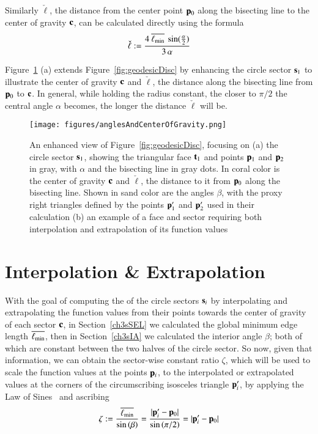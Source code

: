 Similarly $\check{\ell}$, the distance from the center point $\mathbf{p}_0$ along the bisecting line to the center of gravity $\mathbf{c}$, can be calculated directly using the formula
%
\begin{equation}
	\check{\ell} := \frac{4\:\overline{\ell_\text{min}}\:\sin(\frac{\alpha}{2})}{3\,\alpha}
	\label{eq:distToCoG}
\end{equation}%

Figure~\ref{fig:anglesAndCenterOfGravity} (a) extends Figure~\ref{fig:geodesicDisc} by enhancing the circle sector $\mathbf{s}_1$ to illustrate the center of gravity $\mathbf{c}$ and $\check{\ell}$, the distance along the bisecting line from $\mathbf{p}_0$ to $\mathbf{c}$. In general, while holding the radius constant, the closer to $\pi/2$ the central angle $\alpha$ becomes, the longer the distance $\check{\ell}$ will be.

\begin{figure}[ht]
\ffigbox
	{\texttt{[image: figures/anglesAndCenterOfGravity.png]}}
	{\caption[Angles and Center of Gravity]{An enhanced view of Figure~\ref{fig:geodesicDisc}, focusing on (a) the circle sector $\mathbf{s}_1$, showing the triangular face $\mathbf{t}_1$ and points $\mathbf{p}_1$ and $\mathbf{p}_2$ in gray, with $\alpha$ and the bisecting line in gray dots. In coral color is the center of gravity $\mathbf{c}$ and $\check{\ell}$, the distance to it from $\mathbf{p}_0$ along the bisecting line. Shown in sand color are the angles $\beta$, with the proxy right triangles defined by the points $\mathbf{p}'_1$ and $\mathbf{p}'_2$ used in their calculation (b) an example of a face and sector requiring both interpolation and extrapolation of its function values}\label{fig:anglesAndCenterOfGravity}}
\end{figure}%

%
%
%
%
\section{Interpolation \& Extrapolation}
\label{ch3sIE}
With the goal of computing the  of the circle sectors $\mathbf{s}_i$ by interpolating and extrapolating the function values from their points towards the center of gravity of each sector $\mathbf{c}$, in Section~\ref{ch3sSEL} we calculated the global minimum edge length $\overline{\ell_\text{min}}$, then in Section~\ref{ch3sIA} we calculated the interior angle $\beta$; both of which are constant between the two halves of the circle sector. So now, given that information, we can obtain the sector-wise constant ratio $\zeta$, which will be used to scale the function values at the points $\mathbf{p}_i$, to the interpolated or extrapolated values at the corners of the circumscribing isosceles triangle $\mathbf{p}'_i$, by applying the Law of Sines~\cite{Weisstein19g} and ascribing
%
\begin{equation}
	\zeta := \frac{\overline{\ell_\text{min}}}{\sin\left (\beta\right )} = \frac{|\mathbf{p}'_i - \mathbf{p}_0|}{\sin\left (\pi/2\right )} = |\mathbf{p}'_i - \mathbf{p}_0|
	\label{eq:zeta}
\end{equation}%
%

